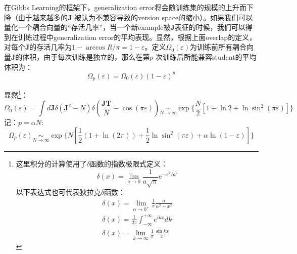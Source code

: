 \documentclass[11pt,fleqn, UTF8]{ctexbook} %
\begin{document}
\begin{subappendices}
在Gibbs Learning的框架下，generalization error将会随训练集的规模的上升而下降（由于越来越多的$\boldsymbol{J}$ 被认为不兼容导致的version space的缩小）。如果我们可以量化一个耦合向量的“存活几率”，当一个新example被$\boldsymbol{J}$表征的时候，我们可以得到在训练过程中generalization error的平均表现。显然，根据上面overlap的定义，对每个$\boldsymbol{J}$的存活几率为$1-\arccos R/\pi=1-\varepsilon$。定义$\Omega_0(\varepsilon)$为训练前所有耦合向量$\boldsymbol{J}$的体积，由于每次训练是独立的，那么在第$p$ 次训练后所能兼容student的平均体积为：
\begin{equation*}
  \Omega_p(\varepsilon)=\Omega_0(\varepsilon)(1-\varepsilon)^p
\end{equation*}

显然\footnote{
这里积分的计算使用了$\delta$函数的指数极限式定义：
\begin{equation*}
  \delta(x) = \lim_{a\to 0}\frac{1}{a \sqrt{\pi}} \mathrm{e}^{-x^2/a^2}
\end{equation*}
以下表达式也可代表狄拉克$\delta$函数：
\begin{gather*}
  \delta(x)=\lim_{\alpha\to 0^+}\frac{1}{\pi}\frac{\alpha}{\alpha^2+x^2} \\
  \delta(x)=\frac{1}{2\pi}\int_{-\infty}^{+\infty}e^{ikx}dk \\
  \delta(x)=\lim_{k\to\infty}\frac{1}{\pi}\frac{\sin{kx}}{x}
\end{gather*}
}：
\begin{equation}\label{appa1}
  \Omega_0(\varepsilon)=\int d\boldsymbol{J}\delta(\boldsymbol{J}^2-N)\delta(\frac{\boldsymbol{JT}}{N}-\cos(\pi\varepsilon))\underset{N\to\infty}{\sim} \exp\{\frac{N}{2}[1+\ln2+\ln\sin^2(\pi\varepsilon)]\}
\end{equation}
记：$p=\alpha N$:
\begin{equation}\label{app1}
  \Omega_p(\varepsilon)\underset{N\to\infty}{\sim} \exp\{N[\frac{1}{2}(1+\ln(2\pi))+\frac{1}{2}\ln\sin^2(\pi\varepsilon)+\alpha\ln(1-\varepsilon)]\}
\end{equation}


\end{subappendices}
\end{document}
